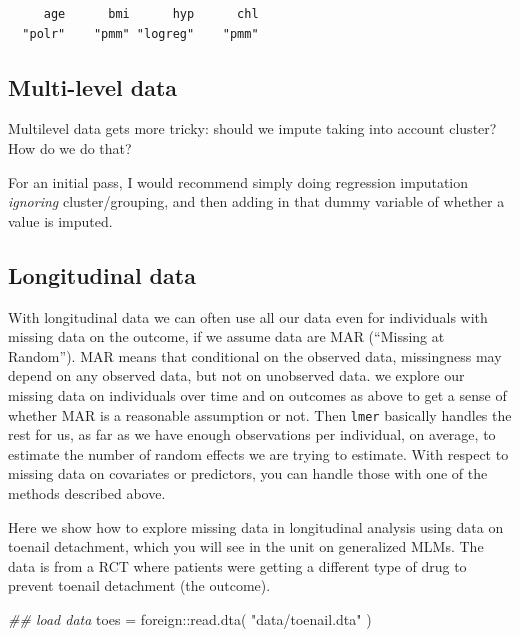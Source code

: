 \documentclass[
  letterpaper,
  DIV=11,
  numbers=noendperiod]{scrreprt}
\newenvironment{Shaded}{}{}
\newcommand{\DocumentationTok}[1]{\textcolor[rgb]{0.73,0.13,0.13}{\textit{#1}}}
\newcommand{\FunctionTok}[1]{\textcolor[rgb]{0.02,0.16,0.49}{#1}}
\newcommand{\NormalTok}[1]{#1}
\newcommand{\OtherTok}[1]{\textcolor[rgb]{0.00,0.44,0.13}{#1}}
\newcommand{\SpecialCharTok}[1]{\textcolor[rgb]{0.25,0.44,0.63}{#1}}
\newcommand{\StringTok}[1]{\textcolor[rgb]{0.25,0.44,0.63}{#1}}
\begin{document}
\begin{verbatim}
     age      bmi      hyp      chl 
  "polr"    "pmm" "logreg"    "pmm" 
\end{verbatim}

\subsection{Multi-level data}\label{multi-level-data}

Multilevel data gets more tricky: should we impute taking into account
cluster? How do we do that?

For an initial pass, I would recommend simply doing regression
imputation \emph{ignoring} cluster/grouping, and then adding in that
dummy variable of whether a value is imputed.

\subsection{Longitudinal data}\label{longitudinal-data}

With longitudinal data we can often use all our data even for
individuals with missing data on the outcome, if we assume data are MAR
(``Missing at Random''). MAR means that conditional on the observed
data, missingness may depend on any observed data, but not on unobserved
data. we explore our missing data on individuals over time and on
outcomes as above to get a sense of whether MAR is a reasonable
assumption or not. Then \texttt{lmer} basically handles the rest for us,
as far as we have enough observations per individual, on average, to
estimate the number of random effects we are trying to estimate. With
respect to missing data on covariates or predictors, you can handle
those with one of the methods described above.

Here we show how to explore missing data in longitudinal analysis using
data on toenail detachment, which you will see in the unit on
generalized MLMs. The data is from a RCT where patients were getting a
different type of drug to prevent toenail detachment (the outcome).

\begin{Shaded}
\begin{Highlighting}[]
\DocumentationTok{\#\# load data}
\NormalTok{  toes }\OtherTok{=}\NormalTok{ foreign}\SpecialCharTok{::}\FunctionTok{read.dta}\NormalTok{( }\StringTok{"data/toenail.dta"}\NormalTok{ )}
\end{Highlighting}
\end{Shaded}
\end{document}
